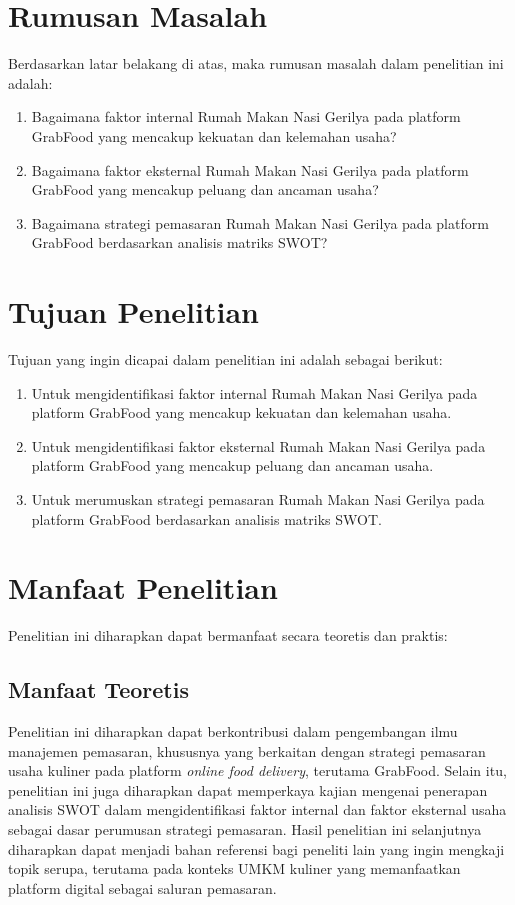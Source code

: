 \section{Rumusan Masalah}
Berdasarkan latar belakang di atas, maka rumusan masalah dalam penelitian ini adalah:
\begin{enumerate}
    \item Bagaimana faktor internal Rumah Makan Nasi Gerilya pada platform GrabFood yang mencakup kekuatan dan kelemahan usaha?
    \item Bagaimana faktor eksternal Rumah Makan Nasi Gerilya pada platform GrabFood yang mencakup peluang dan ancaman usaha?
    \item Bagaimana strategi pemasaran Rumah Makan Nasi Gerilya pada platform GrabFood berdasarkan analisis matriks SWOT?
\end{enumerate}

\section{Tujuan Penelitian}
Tujuan yang ingin dicapai dalam penelitian ini adalah sebagai berikut:
\begin{enumerate}
    \item Untuk mengidentifikasi faktor internal Rumah Makan Nasi Gerilya pada platform GrabFood yang mencakup kekuatan dan kelemahan usaha.
    \item Untuk mengidentifikasi faktor eksternal Rumah Makan Nasi Gerilya pada platform GrabFood yang mencakup peluang dan ancaman usaha.
    \item Untuk merumuskan strategi pemasaran Rumah Makan Nasi Gerilya pada platform GrabFood berdasarkan analisis matriks SWOT.
\end{enumerate}

\section{Manfaat Penelitian}
Penelitian ini diharapkan dapat bermanfaat secara teoretis dan praktis:
\subsection{Manfaat Teoretis}
Penelitian ini diharapkan dapat berkontribusi dalam pengembangan ilmu manajemen pemasaran, khususnya yang berkaitan dengan strategi pemasaran usaha kuliner pada platform \textit{online food delivery}, terutama GrabFood. Selain itu, penelitian ini juga diharapkan dapat memperkaya kajian mengenai penerapan analisis SWOT dalam mengidentifikasi faktor internal dan faktor eksternal usaha sebagai dasar perumusan strategi pemasaran. Hasil penelitian ini selanjutnya diharapkan dapat menjadi bahan referensi bagi peneliti lain yang ingin mengkaji topik serupa, terutama pada konteks UMKM kuliner yang memanfaatkan platform digital sebagai saluran pemasaran.
